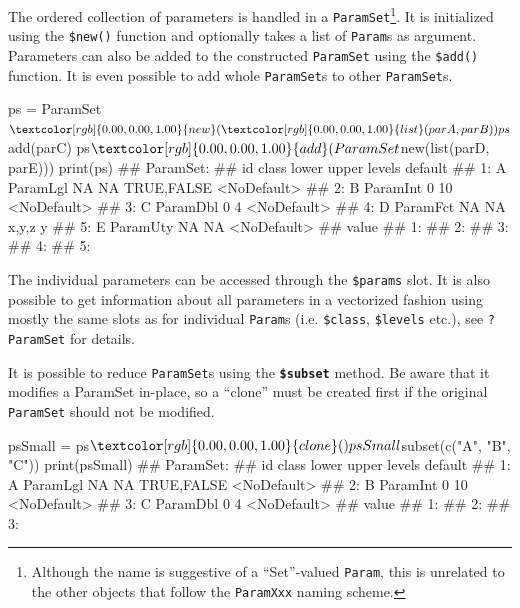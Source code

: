 \documentclass[
  11pt,
  parskip=half,
  DIV=calc,
  BCOR=10mm,
  x11names]{scrbook}
\newenvironment{Shaded}{}{}
\newcommand{\KeywordTok}[1]{\textcolor[rgb]{0.00,0.00,1.00}{#1}}
\newcommand{\NormalTok}[1]{#1}
\newcommand{\OperatorTok}[1]{#1}
\newcommand{\StringTok}[1]{\textcolor[rgb]{0.00,0.50,0.50}{#1}}
\begin{document}
The ordered collection of parameters is handled in a \texttt{ParamSet}\footnote{Although the name is suggestive of a ``Set''-valued \texttt{Param}, this is unrelated to the other objects that follow the \texttt{ParamXxx} naming scheme.}.
It is initialized using the \texttt{\$new()} function and optionally takes a list of \texttt{Param}s as argument.
Parameters can also be added to the constructed \texttt{ParamSet} using the \texttt{\$add()} function.
It is even possible to add whole \texttt{ParamSet}s to other \texttt{ParamSet}s.

\begin{Shaded}
\begin{Highlighting}[]
\NormalTok{ps =}\StringTok{ }\NormalTok{ParamSet}\OperatorTok{$}\KeywordTok{new}\NormalTok{(}\KeywordTok{list}\NormalTok{(parA, parB))}
\NormalTok{ps}\OperatorTok{$}\KeywordTok{add}\NormalTok{(parC)}
\NormalTok{ps}\OperatorTok{$}\KeywordTok{add}\NormalTok{(ParamSet}\OperatorTok{$}\KeywordTok{new}\NormalTok{(}\KeywordTok{list}\NormalTok{(parD, parE)))}
\KeywordTok{print}\NormalTok{(ps)}
\NormalTok{## ParamSet: }
\NormalTok{##    id    class lower upper      levels     default}
\NormalTok{## 1:  A ParamLgl    NA    NA  TRUE,FALSE <NoDefault>}
\NormalTok{## 2:  B ParamInt     0    10             <NoDefault>}
\NormalTok{## 3:  C ParamDbl     0     4             <NoDefault>}
\NormalTok{## 4:  D ParamFct    NA    NA       x,y,z           y}
\NormalTok{## 5:  E ParamUty    NA    NA             <NoDefault>}
\NormalTok{##    value}
\NormalTok{## 1:      }
\NormalTok{## 2:      }
\NormalTok{## 3:      }
\NormalTok{## 4:      }
\NormalTok{## 5:}
\end{Highlighting}
\end{Shaded}

The individual parameters can be accessed through the \texttt{\$params} slot.
It is also possible to get information about all parameters in a vectorized fashion using mostly the same slots as for individual \texttt{Param}s (i.e. \texttt{\$class}, \texttt{\$levels} etc.), see \texttt{?ParamSet} for details.

It is possible to reduce \texttt{ParamSet}s using the \textbf{\texttt{\$subset}} method.
Be aware that it modifies a ParamSet in-place, so a ``clone'' must be created first if the original \texttt{ParamSet} should not be modified.

\begin{Shaded}
\begin{Highlighting}[]
\NormalTok{psSmall =}\StringTok{ }\NormalTok{ps}\OperatorTok{$}\KeywordTok{clone}\NormalTok{()}
\NormalTok{psSmall}\OperatorTok{$}\KeywordTok{subset}\NormalTok{(}\KeywordTok{c}\NormalTok{(}\StringTok{"A"}\NormalTok{, }\StringTok{"B"}\NormalTok{, }\StringTok{"C"}\NormalTok{))}
\KeywordTok{print}\NormalTok{(psSmall)}
\NormalTok{## ParamSet: }
\NormalTok{##    id    class lower upper      levels     default}
\NormalTok{## 1:  A ParamLgl    NA    NA  TRUE,FALSE <NoDefault>}
\NormalTok{## 2:  B ParamInt     0    10             <NoDefault>}
\NormalTok{## 3:  C ParamDbl     0     4             <NoDefault>}
\NormalTok{##    value}
\NormalTok{## 1:      }
\NormalTok{## 2:      }
\NormalTok{## 3:}
\end{Highlighting}
\end{Shaded}
\end{document}
